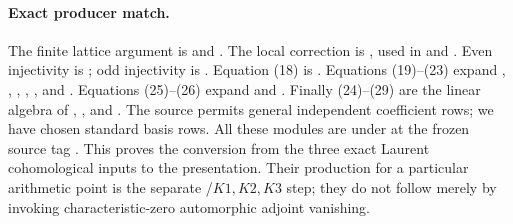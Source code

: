 \paragraph{Exact producer match.}
The finite lattice argument is 
and .
The local correction is , used in
 and .
Even injectivity is ; odd injectivity
is .
Equation (18) is .
Equations (19)--(23) expand ,
, , ,
, and .
Equations (25)--(26) expand
 and
.
Finally (24)--(29) are the linear algebra of
, , and
.
The source permits general independent coefficient rows;
we have chosen standard basis rows.
All these modules are under
 at the frozen source tag
.
This proves the conversion from the three exact Laurent
cohomological inputs to the presentation.
Their production for a particular arithmetic point is the
separate /$K1,K2,K3$ step; they do not follow
merely by invoking characteristic-zero automorphic adjoint
vanishing.

